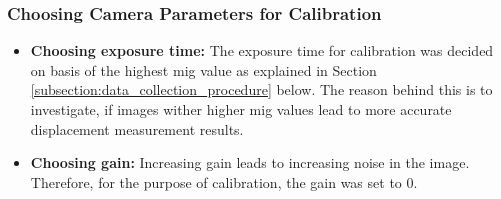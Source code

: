     \subsubsection*{Choosing Camera Parameters for Calibration}\label{subsection:camera_parameters}
        \begin{itemize}
            
            \item \textbf{Choosing exposure time:} The exposure time for calibration was decided on basis of the highest \gls{mig} value as explained in Section \ref{subsection:data_collection_procedure} below. The reason behind this is to investigate, if images wither higher \gls{mig} values lead to more accurate displacement measurement results.
            
            \item \textbf{Choosing gain:} Increasing gain leads to increasing noise in the image. Therefore, for the purpose of calibration, the gain was set to 0.

        \end{itemize}


        

